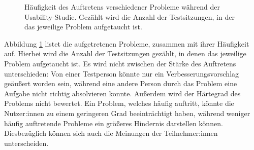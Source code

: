 \begin{figure}[!ht]
  \caption{Häufigkeit des Auftretens verschiedener Probleme während der Usability-Studie. Gezählt wird die Anzahl der Testsitzungen, in der das jeweilige Problem aufgetaucht ist.}
  \label{fig:problems}
\end{figure}

Abbildung \ref{fig:problems} listet die aufgetretenen Probleme, zusammen mit ihrer Häufigkeit auf. Hierbei wird die Anzahl der Testsitzungen gezählt, in denen das jeweilige Problem aufgetaucht ist. Es wird nicht zwischen der Stärke des Auftretens unterschieden: Von einer Testperson könnte nur ein Verbesserungsvorschlag geäußert worden sein, während eine andere Person durch das Problem eine Aufgabe nicht richtig absolvieren konnte. Außerdem wird der Härtegrad des Problems nicht bewertet. Ein Problem, welches häufig auftritt, könnte die Nutzer:innen zu einem geringeren Grad beeinträchtigt haben, während weniger häufig auftretende Probleme ein größeres Hindernis darstellen können. Diesbezüglich können sich auch die Meinungen der Teilnehmer:innen unterscheiden.

